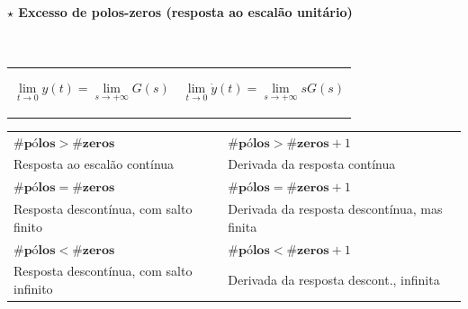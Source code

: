 \paragraph[1.2.2.1 Excesso de pólos-zeros]{$\pmb{\star}$ Excesso de polos-zeros (resposta ao escalão unitário)}\mbox{}\\
\begin{center}%
    \begin{tabular}{c c}%
        \begin{minipage}{0.425\linewidth}%
            \vspace{-1em}
            \begin{mdframed}
                $$
                    \lim_{t \to 0} y(t) = \lim_{s \to +\infty} G(s)
                $$
            \end{mdframed}
        \end{minipage}%
        &%
        \begin{minipage}{0.425\linewidth}%
            \vspace{-1em}
            \begin{mdframed}
                $$
                    \lim_{t \to 0} \dot{y}(t) = \lim_{s \to +\infty} sG(s)
                $$
            \end{mdframed}
        \end{minipage}%
    \end{tabular}%
\end{center}%

{\setlength{\tabcolsep}{16pt}
\begin{center}
    \begin{tabular}{p{} | p{}}
        \centerline{\underline{$\#\textbf{pólos} > \#\textbf{zeros}$}} & \centerline{\underline{$\#\textbf{pólos} > \#\textbf{zeros}+1$}} \\[-14pt]
        Resposta ao escalão contínua & Derivada da resposta contínua \\[4pt]
        \centerline{\underline{$\#\textbf{pólos} = \#\textbf{zeros}$}} & \centerline{\underline{$\#\textbf{pólos} = \#\textbf{zeros}+1$}} \\[-14pt]
        Resposta descontínua, com salto finito & Derivada da resposta descontínua, mas finita \\[4pt]
        \centerline{\underline{$\#\textbf{pólos} < \#\textbf{zeros}$}} & \centerline{\underline{$\#\textbf{pólos} < \#\textbf{zeros}+1$}} \\[-14pt]
        Resposta descontínua, com salto infinito & Derivada da resposta descont.,  infinita \\
        \bottomrule
    \end{tabular}
\end{center}
}

